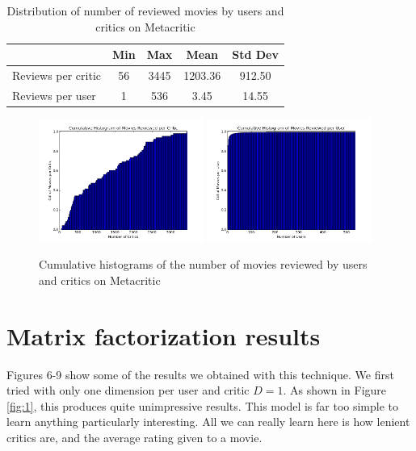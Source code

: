 \documentclass[12pt]{article}
\begin{document}
	\begin{table}[H]
	\centering
	 \caption{Distribution of number of reviewed movies by users and critics on Metacritic}

	 \begin{tabular}{ l | c | c | c | c }
	 \hline
	 &  Min & Max & Mean & Std Dev  \\
	 \hline
	 Reviews per critic & 56 & 3445 & 1203.36 & 912.50 \\
	 Reviews per user & 1 & 536 & 3.45 & 14.55 \\
	 \hline
	 \end{tabular}
	 \end{table}


	 \begin{figure}[H]
	    \centering
	    \includegraphics[width=0.48\textwidth]{plots/plot_m_crit_top.png}
	    \includegraphics[width=0.48\textwidth]{plots/plot_m_crit_usr.png}
	    \caption{Cumulative histograms of the number of movies reviewed by users and critics on Metacritic}
	    \label{fig:m_crit}
	\end{figure}


\section{Matrix factorization results}

Figures 6-9 show some of the results we obtained with this technique. We first tried with only one dimension per user and critic $D=1$. As shown in Figure \ref{fig:1}, this produces quite unimpressive results. This model is far too simple to learn anything particularly interesting. All we can really learn here is how lenient critics are, and the average rating given to a movie.
\end{document}
